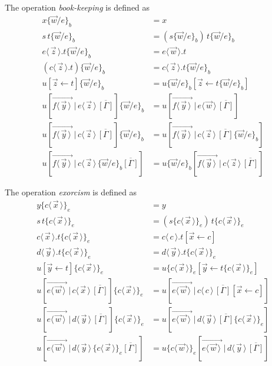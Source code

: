 \documentclass[a4paper,UKenglish,cleveref, autoref]{lipics-v2019}
\newcommand{\app}[2]{#1 \, #2}
\newcommand{\fake}[3]{#1 \langle \, #2 \, \rangle . #3}
\newcommand{\share}[3]{#1 [#2 \leftarrow #3]}
\newcommand{\dist}[5]{#1 [ #2 \, \vert \, \fakedist{#4}{#5} \, #3 ]}
\newcommand{\fakedist}[2]{#1 \langle \, #2 \, \rangle}
\newcommand{\vecdist}[2]{\overrightarrow{\fakedist{#1}{#2} \,}}
\newcommand{\psub}[3]{#1 \{ #2 / #3 \}_{b}}
\newcommand{\exor}[3]{#1 \{ \fakedist{#2}{#3} \}_{e}}
\begin{document}
\begin{definition} The operation \emph{book-keeping} is defined as
\label{def:bk}
\begingroup
\allowdisplaybreaks
	\begin{align*}
		\psub{x}{\vec{w}}{e} &= x \\
		\psub{\app{s}{t}}{\vec{w}}{e} &= \app{(\psub{s}{\vec{w}}{e})}{\psub{t}{\vec{w}}{e}} \\
		\psub{\fake{e}{\vec{z}}{t}}{\vec{w}}{e} &= \fake{e}{\vec{w}}{t} \\
		\psub{(\fake{c}{\vec{z}}{t})}{\vec{w}}{e} &= \fake{c}{\vec{z}}{\psub{t}{\vec{w}}{e}} \\
		\psub{\share{u}{\vec{z}}{t}}{\vec{w}}{e} &= \share{\psub{u}{\vec{w}}{e}}{\vec{z}}{\psub{t}{\vec{w}}{e}} \\
		\psub{\dist{u}{\vecdist{f}{\vec{y}}}{\overline{[\Gamma]}}{e}{\vec{z}}}{\vec{w}}{e} &= \dist{u}{\vecdist{f}{\vec{y}}}{\overline{[\Gamma]}}{e}{\vec{w}} \\
		\psub{\dist{u}{\vecdist{f}{\vec{y}}}{\overline{[\Gamma]}}{c}{\vec{z}}}{\vec{w}}{e} &= \dist{u}{\vecdist{f}{\vec{y}}}{\overline{[\Gamma]} \psub{}{\vec{w}}{e}}{c}{\vec{z}} \\
		\dist{u}{\vecdist{f}{\vec{y}}}{\psub{}{\vec{w}}{e}\overline{[\Gamma]}}{c}{\vec{z}} &= \dist{\psub{u}{\vec{w}}{e}}{\vecdist{f}{\vec{y}}}{\overline{[\Gamma]}}{c}{\vec{z}}
	\end{align*}
\endgroup
\end{definition}

\begin{definition}[Exorcism] The operation \emph{exorcism} is defined as
\label{def:exor}
\begingroup
\allowdisplaybreaks
	\begin{align*}
		\exor{y}{c}{\vec{x}} 	&= y \\
		\exor{\app{s}{t}}{c}{\vec{x}} &= \app{(\exor{s}{c}{\vec{x}})}{\exor{t}{c}{\vec{x}}} \\
		\exor{\fake{c}{\vec{x}}{t}}{c}{\vec{x}} &= \fake{c}{c}{\share{t}{\vec{x}}{c}} \\
		\exor{\fake{d}{\vec{y}}{t}}{c}{\vec{x}} &= \fake{d}{\vec{y}}{\exor{t}{c}{\vec{x}}}\\
		\exor{\share{u}{\vec{y}}{t}}{c}{\vec{x}} &= \share{\exor{u}{c}{\vec{x}}}{\vec{y}}{\exor{t}{c}{\vec{x}}} \\
		\exor{\dist{u}{\vecdist{e}{\vec{w}}}{\overline{[\Gamma]}}{c}{\vec{x}}}{c}{\vec{x}} &= \dist{u}{\vecdist{e}{\vec{w}}}{\overline{[\Gamma]} \share{}{\vec{x}}{c}}{c}{c} \\
		\exor{\dist{u}{\vecdist{e}{\vec{w}}}{\overline{[\Gamma]}}{d}{\vec{y}}}{c}{\vec{x}} &= \dist{u}{\vecdist{e}{\vec{w}}}{\exor{\overline{[\Gamma]}}{c}{\vec{x}}}{d}{\vec{y}} \\
		\dist{u}{\vecdist{e}{\vec{w}}}{ \exor{}{c}{\vec{x}} \overline{[\Gamma]}}{d}{\vec{y}} &= \dist{\exor{u}{c}{\vec{w}}}{\vecdist{e}{\vec{w}}}{\overline{[\Gamma]}}{d}{\vec{y}}
	\end{align*}
\endgroup
\end{definition}
\end{document}

